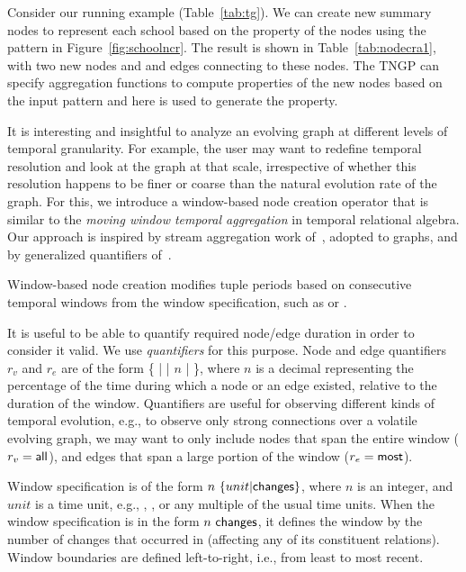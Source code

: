 \begin{example}
Consider our running example \tg \ttt (Table~\ref{tab:tg}).  We can
create new summary nodes to represent each school based on the
 property of the nodes using the pattern in
Figure~\ref{fig:schoolncr}.  The result is shown in
Table~\ref{tab:nodecra1}, with two new nodes  and
 and  edges connecting to these nodes.
The TNGP can specify aggregation functions to compute properties of
the new nodes based on the input pattern and here  is
used to generate the  property.
\end{example}

It is interesting and insightful to analyze an evolving graph at
different levels of temporal granularity.  For example, the user may
want to redefine temporal resolution and look at the graph at that
scale, irrespective of whether this resolution happens to be finer or
coarse than the natural evolution rate of the graph.  For this, we
introduce a window-based node creation operator that is similar to the
{\em moving window temporal aggregation} in temporal relational
algebra.  Our approach is inspired by stream aggregation work
of~\cite{Li2005}, adopted to graphs, and by generalized quantifiers
of~\cite{Hsu1995}.

Window-based node creation modifies tuple periods based on consecutive
temporal windows from the window specification, such as  or .

It is useful to be able to quantify required node/edge duration in
order to consider it valid.  We use {\em quantifiers} for this
purpose.  Node and edge quantifiers $r_v$ and $r_e$ are of the form \{
 |  |  $n$ |  \},
where $n$ is a decimal representing the percentage of the time during
which a node or an edge existed, relative to the duration of the
window.  Quantifiers are useful for observing different kinds of
temporal evolution, e.g., to observe only strong connections over a
volatile evolving graph, we may want to only include nodes that span
the entire window ($r_v=\textsf{all}$), and edges that span a large
portion of the window ($r_e=\textsf{most}$).

Window specification is of the form $n~\{unit|\textsf{changes}\}$,
where $n$ is an integer, and $unit$ is a time unit, e.g., , , or any multiple of the usual time units.
When the window specification is in the form $n~\textsf{changes}$, it
defines the window by the number of changes that occurred in \ttt
(affecting any of its constituent relations). Window boundaries are
defined left-to-right, i.e., from least to most recent.

